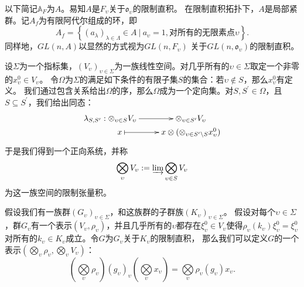   以下简记$\mathbb{A}_F$为$A$。易知$A$是$F_{\upsilon}$关于$\mathfrak{o}_{\upsilon}$的限制直积。
  在限制直积拓扑下，$A$是局部紧群。记$A_f$为有限阿代尔组成的环，即
  $$A_f = \left\{(a_{\lambda})_{\lambda\in \Lambda}\in A\ |\ a_{\upsilon}
  = 1, \text{对所有的无限素点}\upsilon \right\}.$$
  同样地，$GL(n,A)$以显然的方式视为$GL(n,F_{\upsilon})$
  关于$GL(n,\mathfrak{o}_{\upsilon})$的限制直积。

  \begin{definition}
  设$\Sigma$为一个指标集，$(V_{\upsilon})_{\upsilon\in
  \Sigma}$为一族线性空间。对几乎所有的$\upsilon \in \Sigma$取定一个非零的$x^0_{\upsilon} \in V_{\upsilon}$。
  令$\Omega$为$\Sigma$的满足如下条件的有限子集$S$的集合：若$\upsilon\not\in S$，那么$x^0_{\upsilon}$有定义。
  我们通过包含关系给出$\Omega$的序，那么$\Omega$成为一个定向集。对$S,S^{\prime}\in
  \Omega$，且$S\subseteq S^{\prime}$，我们给出同态：
  \[ \xymatrix@R=0em{
  \lambda_{S,S^{\prime}}: \otimes_{\upsilon\in S}
  V_{\upsilon} \ar[r] & \otimes_{\upsilon\in S^{\prime}}
  V_{\upsilon} \\
  \ \ \ \ \ \ \ x \ar@{|->}[r] & x\otimes(\otimes_{\upsilon\in S^{\prime}\setminus S}
  x_{\upsilon}^0) }  \]
  于是我们得到一个正向系统，并称
  $$\bigotimes\limits_{\upsilon} V_{\upsilon} := \varinjlim \bigotimes\limits_{\upsilon\in
  S} V_{\upsilon}$$
  为这一族空间的限制张量积。
  \end{definition}

  假设我们有一族群$(G_{\upsilon})_{\upsilon\in\Sigma}$，和这族群的子群族$(K_{\upsilon})_{\upsilon\in\Sigma}$。
  假设对每个$\upsilon\in\Sigma$，群$G_{\upsilon}$有一个表示$(V_{\upsilon},
  \rho_{\upsilon})$，并且几乎所有的$\upsilon$都存在$\xi_{\upsilon}^0\in
  V_{\upsilon}$使得$\rho_{\upsilon}(k_{\upsilon})\xi_{\upsilon}^0 =
  \xi_{\upsilon}^0$对所有的$k_{\upsilon}\in
  K_{\upsilon}$成立。令$G$为$G_{\upsilon}$关于$K_{\upsilon}$的限制直积，
  那么我们可以定义$G$的一个表示$\left(\bigotimes\limits_{\upsilon}
  \rho_{\upsilon}, \bigotimes\limits_{\upsilon}
  V_{\upsilon}\right)$：
  $$\left(\bigotimes\limits_{\upsilon} \rho_{\upsilon}\right)
  (g_{\upsilon})_{\upsilon} \left(\bigotimes\limits_{\upsilon}
  x_{\upsilon}\right) = \bigotimes\limits_{\upsilon}
  \rho_{\upsilon}(g_{\upsilon})x_{\upsilon}.$$

